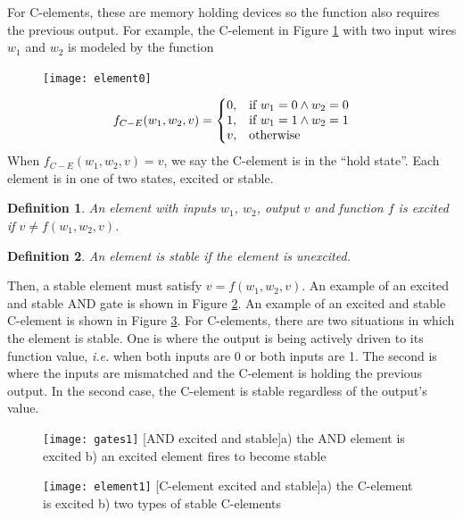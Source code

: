 \documentclass[12pt]{report}
\newtheorem*{definition}{Definition}
\begin{document}
For C-elements, these are memory holding devices so the function also requires the previous output.  For example, the C-element in Figure \ref{fig:element0} with two input wires $w_1$ and $w_2$ is modeled by the function\\
\begin{figure}[h]
\centering
\texttt{[image: element0]}
\label{fig:element0}
\end{figure}
\[
f_{C-E}(w_1,w_2, v) =\left\{
  \begin{array}{@{}ll@{}}
    0, & \text{if}\ w_1=0 \wedge w_2=0\\
    1, & \text{if}\ w_1=1 \wedge w_2=1\\
    v, & \text{otherwise}

  \end{array}\right. 
\]
When $f_{C-E}(w_1,w_2, v) =v$, we say the C-element is in the ``hold state''.  
Each element is in one of two states, excited or stable.  
\begin{definition}
An element with inputs $w_1$, $w_2$, output $v$ and function $f$ is {\em excited} if $v\neq f(w_1,w_2, v)$.  
\end{definition}

\begin{definition} 
An element is stable if the element is unexcited.
\end{definition}
Then, a stable element must satisfy $v= f(w_1,w_2,v)$.  An example of an excited and stable AND gate is shown in Figure \ref{fig:gates1}.  An example of an excited and stable C-element is shown in Figure \ref{fig:element1}.  For C-elements, there are two situations in which the element is stable.  One is where the output is being actively driven to its function value, {\em i.e.} when both inputs are 0 or both inputs are 1.  The second is where the inputs are mismatched and the C-element is holding the previous output.  In the second case, the C-element is stable regardless of the output's value.

\begin{figure}[h]
\centering
\texttt{[image: gates1]}
[AND excited and stable]{a) the AND element is excited  b) an excited element fires to become stable}
\label{fig:gates1}
\end{figure}
\begin{figure}[h]
\centering
\texttt{[image: element1]}
[C-element excited and stable]{a) the C-element is excited  b) two types of stable C-elements}
\label{fig:element1}
\end{figure}
\end{document}
